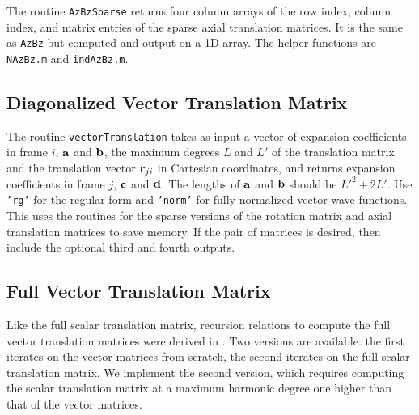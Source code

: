The routine \texttt{AzBzSparse} returns four column arrays of the row index, column index, and matrix entries of the sparse axial translation matrices.  It is the same as \texttt{AzBz} but computed and output on a 1D array.  The helper functions are \texttt{NAzBz.m} and \texttt{indAzBz.m}.


{\scriptsize
{}
}

{\scriptsize
{}
}

{\scriptsize
{}
}

\clearpage
\subsection{Diagonalized Vector Translation Matrix}


The routine \texttt{vectorTranslation} takes as input a vector of expansion coefficients in frame $i$, $\mathbf{a}$ and $\mathbf{b}$, the maximum degrees $L$ and $L'$ of the translation matrix and the translation vector $\mathbf{r}_{ji}$ in Cartesian coordinates, and returns expansion coefficients in frame $j$, $\mathbf{c}$ and $\mathbf{d}$. The lengths of $\mathbf{a}$ and $\mathbf{b}$ should be $L'^2 + 2L' $.  Use \texttt{'rg'} for the regular form and \texttt{'norm'} for fully normalized vector wave functions. This uses the routines for the sparse versions of the rotation matrix and axial translation matrices to save memory.  If the pair of matrices is desired, then include the optional third and fourth outputs. 


{\scriptsize
{}
}
\clearpage

\subsection{Full Vector Translation Matrix}

Like the full scalar translation matrix, recursion relations to compute the full vector translation matrices were derived in \cite{chew1993efficient}. Two versions are available: the first iterates on the vector matrices from scratch, the second iterates on the full scalar translation matrix. We implement the second version, which requires computing the scalar translation matrix at a maximum harmonic degree one higher than that of the vector matrices. 


